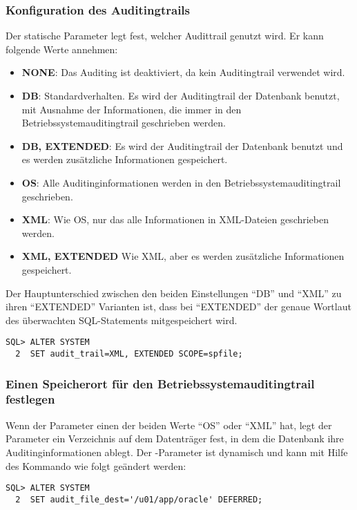         \subsubsection{Konfiguration des Auditingtrails}
          Der statische Parameter  legt fest, welcher Audittrail genutzt wird. Er kann folgende Werte annehmen:
          \begin{itemize}
            \item \textbf{NONE}: Das Auditing ist deaktiviert, da kein Auditingtrail verwendet wird.
            \item \textbf{DB}: Standardverhalten. Es wird der Auditingtrail der Datenbank benutzt, mit Ausnahme der Informationen, die immer in den Betriebssystemauditingtrail geschrieben werden.
            \item \textbf{DB, EXTENDED}: Es wird der Auditingtrail der Datenbank benutzt und es werden zusätzliche Informationen gespeichert.
            \item \textbf{OS}: Alle Auditinginformationen werden in den Betriebssystemauditingtrail geschrieben.
            \item \textbf{XML}: Wie OS, nur das alle Informationen in XML-Dateien geschrieben werden.
            \item \textbf{XML, EXTENDED} Wie XML, aber es werden zusätzliche Informationen gespeichert.
          \end{itemize}
          \begin{merke}
            Der Hauptunterschied zwischen den beiden Einstellungen \enquote{DB} und \enquote{XML} zu ihren \enquote{EXTENDED} Varianten ist, dass bei \enquote{EXTENDED} der genaue Wortlaut des überwachten SQL-Statements mitgespeichert wird.
          \end{merke}
          \begin{lstlisting}[caption={Der Parameter \parameter{audit\_trail}},label=admin800,language=oracle_sql]
SQL> ALTER SYSTEM
  2  SET audit_trail=XML, EXTENDED SCOPE=spfile;
          \end{lstlisting}
        \subsubsection{Einen Speicherort für den Betriebssystemauditingtrail festlegen}
          Wenn der Parameter  einen der beiden Werte \enquote{OS} oder \enquote{XML} hat, legt der Parameter  ein Verzeichnis auf dem Datenträger fest, in dem die Datenbank ihre Auditinginformationen ablegt. Der -Parameter ist dynamisch und kann mit Hilfe des Kommando  wie folgt geändert werden:
          \begin{lstlisting}[caption={Der Parameter \parameter{audit\_file\_dest}},label=admin801,language=oracle_sql]
SQL> ALTER SYSTEM
  2  SET audit_file_dest='/u01/app/oracle' DEFERRED;
          \end{lstlisting}
          \begin{literaturinternet}
            \item \cite{i2282157}
          \end{literaturinternet}

